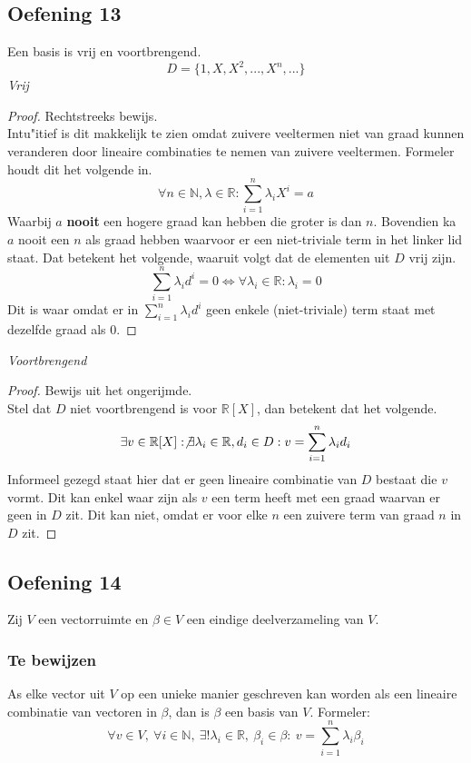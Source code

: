 \documentclass[lineaire_algebra_oplossingen.tex]{subfiles}
\begin{document}
\subsection{Oefening 13}
Een basis is vrij en voortbrengend.
\[
D = \{1,X,X^2,...,X^n,...\}
\]
\emph{Vrij}
\begin{proof}
Rechtstreeks bewijs.\\
Intu"itief is dit makkelijk te zien omdat zuivere veeltermen niet van graad kunnen veranderen door lineaire combinaties te nemen van zuivere veeltermen. Formeler houdt dit het volgende in.
\[
\forall n\in \mathbb{N},\lambda \in \mathbb{R}: \sum_{i=1}^n\lambda_iX^i = a
\] 
Waarbij $a$ \textbf{nooit} een hogere graad kan hebben die groter is dan $n$. Bovendien ka $a$ nooit een $n$ als graad hebben waarvoor er een niet-triviale term in het linker lid staat.
Dat betekent het volgende, waaruit volgt dat de elementen uit $D$ vrij zijn.
\[
\sum_{i=1}^n\lambda_id^i = 0 \Leftrightarrow \forall \lambda_i \in \mathbb{R}: \lambda_i =0
\]
Dit is waar omdat er in $\sum_{i=1}^n\lambda_id^i$ geen enkele (niet-triviale) term staat met dezelfde graad als $0$.
\end{proof}
\emph{Voortbrengend}\\
\begin{proof}
Bewijs uit het ongerijmde.\\
Stel dat $D$ niet voortbrengend is voor $\mathbb{R}[X]$, dan betekent dat het volgende.
\[
\exists v \in \mathbb{R}[X]: \not\exists \lambda_i\in \mathbb{R},d_i \in D: v = \sum_{i=1}^n\lambda_id_i
\]
Informeel gezegd staat hier dat er geen lineaire combinatie van $D$ bestaat die $v$ vormt.
Dit kan enkel waar zijn als $v$ een term heeft met een graad waarvan er geen in $D$ zit. Dit kan niet, omdat er voor elke $n$ een zuivere term van graad $n$ in $D$ zit.
\end{proof}

\subsection{Oefening 14}
Zij $V$ een vectorruimte en $\beta \in V$ een eindige deelverzameling van $V$.
\subsubsection*{Te bewijzen}
As elke vector uit $V$ op een unieke manier geschreven kan worden als een lineaire combinatie van vectoren in $\beta$, dan is $\beta$ een basis van $V$.
Formeler:
\[
\forall v \in V,\ \forall i\in \mathbb{N},\ \exists!\lambda_i\in \mathbb{R},\ \beta_i \in \beta:\ v=\sum_{i = 1}^n\lambda_i\beta_i
\]
\end{document}
